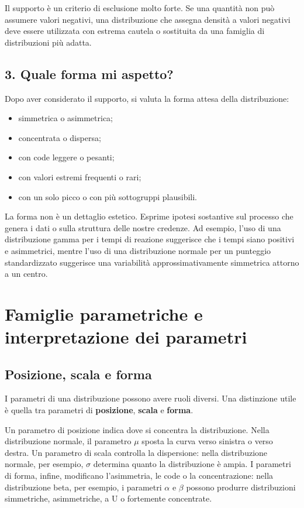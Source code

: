 \documentclass[
  italian,
  letterpaper,
  a4paper,
  11pt,
  open=any]{scrbook}
\providecommand{\tightlist}{%
  \setlength{\itemsep}{0pt}\setlength{\parskip}{0pt}}
\theoremstyle{plain}
\theoremstyle{definition}
\theoremstyle{definition}
\theoremstyle{remark}
\begin{document}
Il supporto è un criterio di esclusione molto forte. Se una quantità non
può assumere valori negativi, una distribuzione che assegna densità a
valori negativi deve essere utilizzata con estrema cautela o sostituita
da una famiglia di distribuzioni più adatta.

\subsection{3. Quale forma mi aspetto?}\label{quale-forma-mi-aspetto}

Dopo aver considerato il supporto, si valuta la forma attesa della
distribuzione:

\begin{itemize}
\tightlist
\item
  simmetrica o asimmetrica;
\item
  concentrata o dispersa;
\item
  con code leggere o pesanti;
\item
  con valori estremi frequenti o rari;
\item
  con un solo picco o con più sottogruppi plausibili.
\end{itemize}

La forma non è un dettaglio estetico. Esprime ipotesi sostantive sul
processo che genera i dati o sulla struttura delle nostre credenze. Ad
esempio, l'uso di una distribuzione gamma per i tempi di reazione
suggerisce che i tempi siano positivi e asimmetrici, mentre l'uso di una
distribuzione normale per un punteggio standardizzato suggerisce una
variabilità approssimativamente simmetrica attorno a un centro.

\section{Famiglie parametriche e interpretazione dei
parametri}\label{sec-parametric-families}

\subsection{Posizione, scala e forma}\label{posizione-scala-e-forma}

I parametri di una distribuzione possono avere ruoli diversi. Una
distinzione utile è quella tra parametri di \textbf{posizione},
\textbf{scala} e \textbf{forma}.

Un parametro di posizione indica dove si concentra la distribuzione.
Nella distribuzione normale, il parametro \(\mu\) sposta la curva verso
sinistra o verso destra. Un parametro di scala controlla la dispersione:
nella distribuzione normale, per esempio, \(\sigma\) determina quanto la
distribuzione è ampia. I parametri di forma, infine, modificano
l'asimmetria, le code o la concentrazione: nella distribuzione beta, per
esempio, i parametri \(\alpha\) e \(\beta\) possono produrre
distribuzioni simmetriche, asimmetriche, a U o fortemente concentrate.
\end{document}
